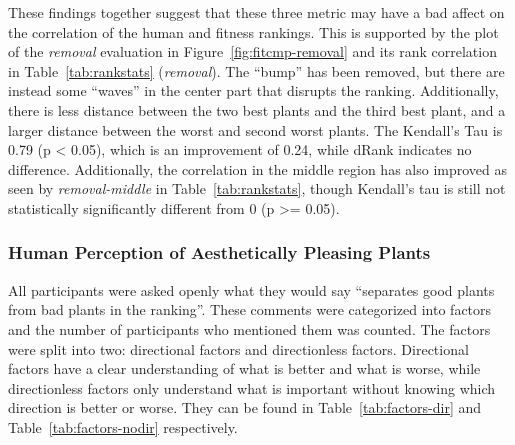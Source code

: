 These findings together suggest that these three metric may have a bad affect on the correlation of the human and fitness rankings.
This is supported by the plot of the \textit{removal} evaluation in Figure~\ref{fig:fitcmp-removal} and its rank correlation in Table~\ref{tab:rankstats} (\textit{removal}).
The ``bump'' has been removed, but there are instead some ``waves'' in the center part that disrupts the ranking.
Additionally, there is less distance between the two best plants and the third best plant, and a larger distance between the worst and second worst plants.
The Kendall's Tau is 0.79 (p < 0.05), which is an improvement of 0.24, while dRank indicates no difference.
Additionally, the correlation in the middle region has also improved as seen by \textit{removal-middle} in Table~\ref{tab:rankstats}, though Kendall's tau is still not statistically significantly different from 0 (p >= 0.05).

\subsubsection{Human Perception of Aesthetically Pleasing Plants}
All participants were asked openly what they would say ``separates good plants from bad plants in the ranking''.
These comments were categorized into factors and the number of participants who mentioned them was counted.
The factors were split into two: directional factors and directionless factors.
Directional factors have a clear understanding of what is better and what is worse, while directionless factors only understand what is important without knowing which direction is better or worse.
They can be found in Table~\ref{tab:factors-dir} and Table~\ref{tab:factors-nodir} respectively.

